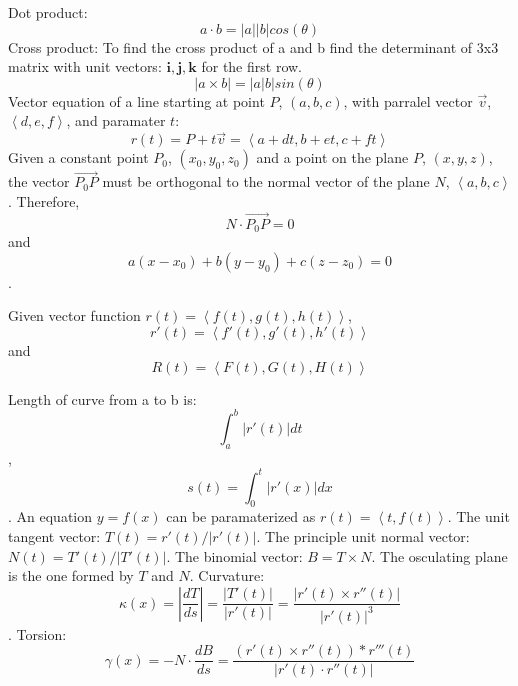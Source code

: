 \documentclass{article}
\begin{document}
Dot product: 
\[a \cdot b = |a||b|cos(\theta)\]
Cross product:
To find the cross product of a and b find the
determinant of 3x3 matrix with unit vectors: $\mathbf{i, j, k}$
for the first row.
\[|a \times  b| = |a|b|sin(\theta) \]
Vector equation of a line starting at point $P$, $(a, b, c)$, 
with parralel vector $\vec{v}$, $\left\langle d, e, f\right\rangle$,
and paramater $t$:
\[
r(t) = P + t\vec{v} = 
\left\langle a + dt, b + et, c + ft\right\rangle
\]
Given a constant point $P_0$, $(x_0,y_0,z_0)$
and a point on the plane $P$, $(x,y,z)$, 
the vector $\vec{P_0P}$ must be orthogonal to the normal vector of the plane $N$, 
$\left\langle a, b, c \right\rangle$.
Therefore, \[N \cdot \vec{P_0P} = 0 \]
and \[a(x-x_0) + b(y-y_0) + c(z-z_0) = 0\].

Given vector function $r(t) = \left\langle f(t), g(t), h(t) \right\rangle$,
\[r'(t) = \left\langle f'(t), g'(t), h'(t) \right\rangle\] and 
\[R(t) = \left\langle F(t), G(t), H(t) \right\rangle\]

Length of curve from a to b is: \[\int_{a}^{b} |r'(t)| dt\],
\[s(t) = \int_{0}^{t} |r'(x)| dx\]. An equation $y = f(x)$ can be paramaterized as
$r(t) = \left\langle t, f(t) \right\rangle$. The unit tangent vector: $T(t) = r'(t)/|r'(t)|$.
The principle unit normal vector: $N(t) = T'(t)/|T'(t)|$.
The binomial vector: $B = T \times N$. The osculating plane is
the one formed by $T$ and $N$. Curvature:
\[
\kappa(x) = |\frac{dT}{ds}| = \frac{|T'(t)|}{|r'(t)|} 
= \frac{|r'(t) \times r''(t)|}{|r'(t)|^3}
\].
Torsion:
\[
\gamma(x) = -N \cdot \frac{dB}{ds} 
= \frac{(r'(t) \times r''(t)) * r'''(t)}{|r'(t) \cdot r''(t)|}
\]
\end{document}
